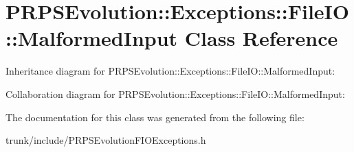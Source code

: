 \hypertarget{class_p_r_p_s_evolution_1_1_exceptions_1_1_file_i_o_1_1_malformed_input}{\section{P\-R\-P\-S\-Evolution\-:\-:Exceptions\-:\-:File\-I\-O\-:\-:Malformed\-Input Class Reference}
\label{class_p_r_p_s_evolution_1_1_exceptions_1_1_file_i_o_1_1_malformed_input}
}


Inheritance diagram for P\-R\-P\-S\-Evolution\-:\-:Exceptions\-:\-:File\-I\-O\-:\-:Malformed\-Input\-:


Collaboration diagram for P\-R\-P\-S\-Evolution\-:\-:Exceptions\-:\-:File\-I\-O\-:\-:Malformed\-Input\-:


The documentation for this class was generated from the following file\-:\begin{DoxyCompactItemize}
\item 
trunk/include/P\-R\-P\-S\-Evolution\-F\-I\-O\-Exceptions.\-h\end{DoxyCompactItemize}
